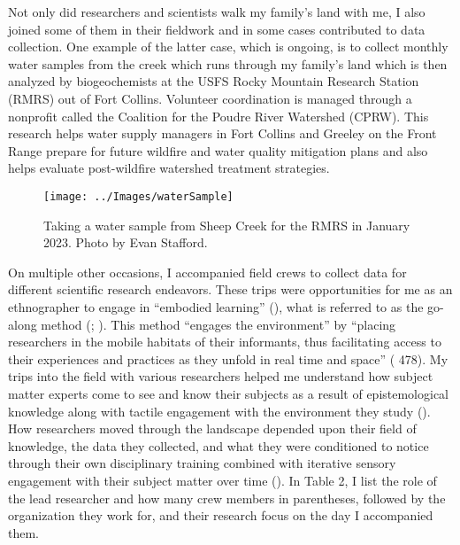 \documentclass[
]{article}
\begin{document}
Not only did researchers and scientists walk my family's land with me, I also joined some of them in their fieldwork and in some cases contributed to data collection. One example of the latter case, which is ongoing, is to collect monthly water samples from the creek which runs through my family's land which is then analyzed by biogeochemists at the USFS Rocky Mountain Research Station (RMRS) out of Fort Collins. Volunteer coordination is managed through a nonprofit called the Coalition for the Poudre River Watershed (CPRW). This research helps water supply managers in Fort Collins and Greeley on the Front Range prepare for future wildfire and water quality mitigation plans and also helps evaluate post-wildfire watershed treatment strategies.

\begin{figure}
\texttt{[image: ../Images/waterSample]} \caption[Sheep Creek water sample]{Taking a water sample from Sheep Creek for the RMRS in January 2023. Photo by Evan Stafford.}\label{fig:figureTitle-23}
\end{figure}

On multiple other occasions, I accompanied field crews to collect data for different scientific research endeavors. These trips were opportunities for me as an ethnographer to engage in ``embodied learning'' (), what is referred to as the go-along method (; ). This method ``engages the environment'' by ``placing researchers in the mobile habitats of their informants, thus facilitating access to their experiences and practices as they unfold in real time and space'' ( 478). My trips into the field with various researchers helped me understand how subject matter experts come to see and know their subjects as a result of epistemological knowledge along with tactile engagement with the environment they study (). How researchers moved through the landscape depended upon their field of knowledge, the data they collected, and what they were conditioned to notice through their own disciplinary training combined with iterative sensory engagement with their subject matter over time (). In Table 2, I list the role of the lead researcher and how many crew members in parentheses, followed by the organization they work for, and their research focus on the day I accompanied them.
\end{document}
